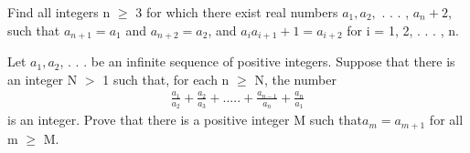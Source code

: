 \item Find all integers n $\geq$ 3 for which there exist real numbers $a_1, a_2,$ . . . , $a_n+2$, such that 
$a_{n + 1} = a_1$ and $a_{n + 2} = a_2$, and $a_ia_{i + 1} + 1 = a_{i + 2}$ for i = 1, 2, . . . , n.

\item Let $a_1,a_2$, . . . be an infinite sequence of positive integers. Suppose that there is an
integer N $>$ 1 such that, for each n $\geq$ N, the number
\begin{align*}
\frac{a_1}{a_2} + \frac{a_2}{a_3}+.....+\frac{a_{n-1}}{a_n}+\frac{a_n}{a_1}
\end{align*}
is an integer. Prove that there is a positive integer M such that$a_m = a_{m+1}$ for all m $\geq$ M.
